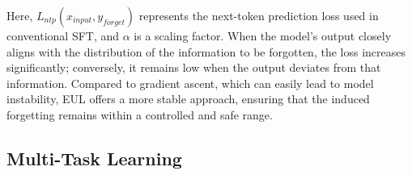 \documentclass[11pt]{article}
\begin{document}


Here, $L_{ntp}(x_{input},y_{forget})$ represents the next-token prediction loss used in conventional SFT, and $\alpha$ is a scaling factor. When the model's output closely aligns with the distribution of the information to be forgotten, the loss increases significantly; conversely, it remains low when the output deviates from that information. Compared to gradient ascent, which can easily lead to model instability, EUL offers a more stable approach, ensuring that the induced forgetting remains within a controlled and safe range.

\subsection{Multi-Task Learning}
\label{sec:MTL}
\end{document}
